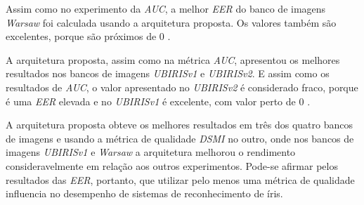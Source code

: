 \par Assim como no experimento da \textit{\acrshort{AUC}}, a melhor \textit{\acrshort{EER}} do banco de imagens \textit{\acrshort{Warsaw}} foi calculada usando a arquitetura proposta. Os valores também são excelentes, porque são próximos de 0 \cite{eer, d33BEAT}.


\par A arquitetura proposta, assim como na métrica \textit{\acrshort{AUC}}, apresentou os melhores resultados nos bancos de imagens \textit{UBIRISv1} e \textit{UBIRISv2}. E assim como os resultados de \textit{\acrshort{AUC}}, o valor apresentado no \textit{UBIRISv2} é considerado fraco, porque é uma \textit{\acrshort{EER}} elevada e no \textit{UBIRISv1} é excelente, com valor perto de 0 \cite{eer, d33BEAT}.

\par A arquitetura proposta obteve os melhores resultados em três dos quatro bancos de imagens e usando a métrica de qualidade \textit{\acrshort{DSMI}} no outro, onde nos bancos de imagens \textit{UBIRISv1} e \textit{\acrshort{Warsaw}} a arquitetura melhorou o rendimento consideravelmente em relação aos outros experimentos. Pode-se afirmar pelos resultados das \textit{\acrshort{EER}}, portanto, que utilizar pelo menos uma métrica de qualidade influencia no desempenho de sistemas de reconhecimento de íris.

